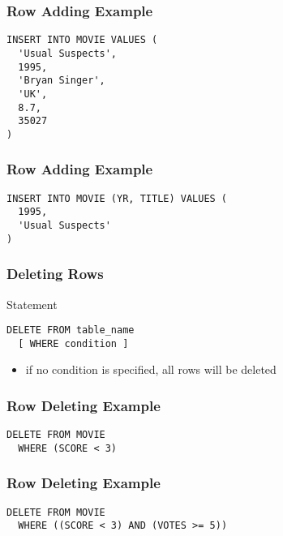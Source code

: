 \documentclass[dvipsnames]{beamer}
\theoremstyle{plain}
\begin{document}
\begin{frame}[fragile]
  \frametitle{Row Adding Example}

  \begin{example}
    \begin{lstlisting}
INSERT INTO MOVIE VALUES (
  'Usual Suspects',
  1995,
  'Bryan Singer',
  'UK',
  8.7,
  35027
)
    \end{lstlisting}
  \end{example}
\end{frame}

\begin{frame}[fragile]
  \frametitle{Row Adding Example}

  \begin{example}
    \begin{lstlisting}
INSERT INTO MOVIE (YR, TITLE) VALUES (
  1995,
  'Usual Suspects'
)
    \end{lstlisting}
  \end{example}
\end{frame}

\begin{frame}[fragile]
  \frametitle{Deleting Rows}

  \begin{block}{Statement}
    \begin{lstlisting}
DELETE FROM table_name
  [ WHERE condition ]
    \end{lstlisting}
  \end{block}

  \pause
  \begin{itemize}
    \item if no condition is specified, all rows will be deleted
  \end{itemize}
\end{frame}

\begin{frame}[fragile]
  \frametitle{Row Deleting Example}

  \begin{example}
    \begin{lstlisting}
DELETE FROM MOVIE
  WHERE (SCORE < 3)
    \end{lstlisting}
  \end{example}
\end{frame}

\begin{frame}[fragile]
  \frametitle{Row Deleting Example}

  \begin{example}
    \begin{lstlisting}
DELETE FROM MOVIE
  WHERE ((SCORE < 3) AND (VOTES >= 5))
    \end{lstlisting}
  \end{example}
\end{frame}
\end{document}
